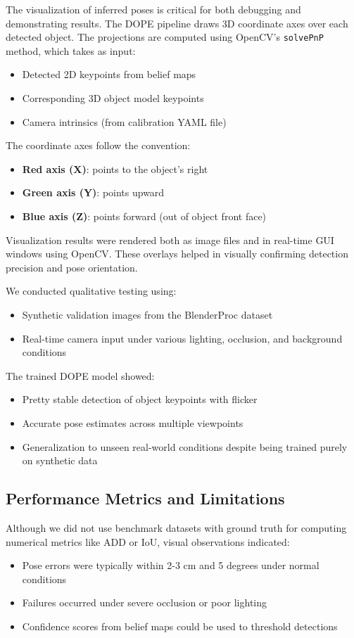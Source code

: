 \documentclass[conference]{IEEEtran}
\begin{document}
The visualization of inferred poses is critical for both debugging and demonstrating results. The DOPE pipeline draws 3D coordinate axes over each detected object. The projections are computed using OpenCV's \texttt{solvePnP} method, which takes as input:
\begin{itemize}
\item Detected 2D keypoints from belief maps
\item Corresponding 3D object model keypoints
\item Camera intrinsics (from calibration YAML file)
\end{itemize}

The coordinate axes follow the convention:
\begin{itemize}
\item \textbf{Red axis (X)}: points to the object's right
\item \textbf{Green axis (Y)}: points upward
\item \textbf{Blue axis (Z)}: points forward (out of object front face)
\end{itemize}

Visualization results were rendered both as image files and in real-time GUI windows using OpenCV. These overlays helped in visually confirming detection precision and pose orientation.



We conducted qualitative testing using:
\begin{itemize}
\item Synthetic validation images from the BlenderProc dataset
\item Real-time camera input under various lighting, occlusion, and background conditions
\end{itemize}

The trained DOPE model showed:
\begin{itemize}
\item Pretty stable detection of object keypoints with flicker
\item Accurate pose estimates across multiple viewpoints
\item Generalization to unseen real-world conditions despite being trained purely on synthetic data
\end{itemize}




\subsection{Performance Metrics and Limitations}
Although we did not use benchmark datasets with ground truth for computing numerical metrics like ADD or IoU, visual observations indicated:
\begin{itemize}
\item Pose errors were typically within 2-3 cm and 5 degrees under normal conditions
\item Failures occurred under severe occlusion or poor lighting
\item Confidence scores from belief maps could be used to threshold detections
\end{itemize}
\end{document}
